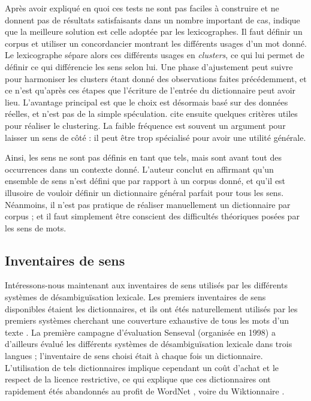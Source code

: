 Après avoir expliqué en quoi ces tests ne sont pas faciles à construire et ne donnent pas de résultats satisfaisants dans un nombre important de cas, \cite{kilgarriff1997don} indique que la meilleure solution est celle adoptée par les lexicographes. Il faut définir un corpus et utiliser un concordancier montrant les différents usages d'un mot donné. Le lexicographe sépare alors ces différents usages en \textit{clusters}, ce qui lui permet de définir ce qui différencie les sens selon lui. Une phase d'ajustement peut suivre pour harmoniser les clusters étant donné des observations faites précédemment, et ce n'est qu'après ces étapes que l'écriture de l'entrée du dictionnaire peut avoir lieu. L'avantage principal est que le choix est désormais basé sur des données réelles, et n'est pas de la simple spéculation. \cite{kilgarriff1997don} cite ensuite quelques critères utiles pour réaliser le clustering. La faible fréquence est souvent un argument pour laisser un sens de côté : il peut être trop spécialisé pour avoir une utilité générale.

Ainsi, les sens ne sont pas définis en tant que tels, mais sont avant tout des occurrences dans un contexte donné. L'auteur conclut en affirmant qu'un ensemble de sens n'est défini que par rapport à un corpus donné, et qu'il est illusoire de vouloir définir un dictionnaire général parfait pour tous les sens. Néanmoins, il n'est pas pratique de réaliser manuellement un dictionnaire par corpus ; et il faut simplement être conscient des difficultés théoriques posées par les sens de mots. 

\subsection{Inventaires de sens}

Intéressons-nous maintenant aux inventaires de sens utilisés par les différents systèmes de désambiguïsation lexicale. Les premiers inventaires de sens disponibles étaient les dictionnaires, et ils ont étés naturellement utilisés par les premiers systèmes cherchant une couverture exhaustive de tous les mots d'un texte \citep{lesk1986automatic}. La première campagne d'évaluation Senseval (organisée en 1998) \citep{kilgarriff2000introduction} a d'ailleurs évalué les différents systèmes de désambiguïsation lexicale dans trois langues ; l'inventaire de sens choisi était à chaque fois un dictionnaire. L'utilisation de tels dictionnaires implique cependant un coût d'achat et le respect de la licence restrictive, ce qui explique que ces dictionnaires ont rapidement étés abandonnés au profit de WordNet \citep{edmonds2002introduction}, voire du Wiktionnaire \citep{mouton2010jaws}.%


